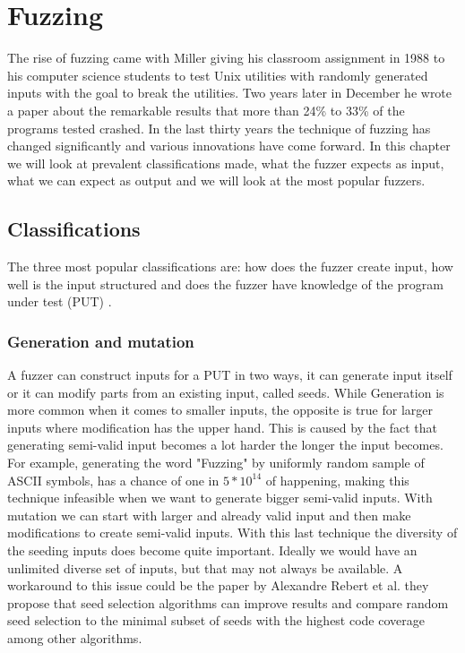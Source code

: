 \chapter{Fuzzing}
\label{cha:2:fuzzing}
\label{fuzzing:intro}
The rise of fuzzing came with Miller giving his classroom assignment \cite{21FuzzingAssignment} in 1988 to his computer science students to test Unix utilities with randomly generated inputs with the goal to break the utilities. Two years later in December he wrote a paper \cite{4originalFuzzingUnixUtils} about the remarkable results that more than 24\% to 33\% of the programs tested crashed.
In the last thirty years the technique of fuzzing has changed significantly and various innovations have come forward. In this chapter we will look at prevalent classifications made, what the fuzzer expects as input, what we can expect as output and we will look at the most popular fuzzers.

\section{Classifications}
\label{cha:2:Classifications}
The three most popular classifications are: how does the fuzzer create input, how well is the input structured and does the fuzzer have knowledge of the program under test (PUT) \cite{30FuzzingHackartandscience, 12Fuzzingasurvey, 13manes2019survey}.

\subsection{Generation and mutation}
\label{cha:2:generationMutation}
A fuzzer can construct inputs for a PUT in two ways, it can generate input itself or it can modify parts from an existing input, called seeds. While Generation is more common when it comes to smaller inputs, the opposite is true for larger inputs where modification has the upper hand. This is caused by the fact that generating semi-valid input becomes a lot harder the longer the input becomes. For example, generating the word "Fuzzing" by uniformly random sample of ASCII symbols, has a chance of one in $5*10^{14}$ of happening, making this technique infeasible when we want to generate bigger semi-valid inputs. With mutation we can start with larger and already valid input and then make modifications to create semi-valid inputs. With this last technique the diversity of the seeding inputs does become quite important. Ideally we would have an unlimited diverse set of inputs, but that may not always be available. A workaround to this issue could be the paper by Alexandre Rebert et al. \cite{14rebert2014seedselecting} they propose that seed selection algorithms can improve results and compare random seed selection to the minimal subset of seeds with the highest code coverage among other algorithms. 


